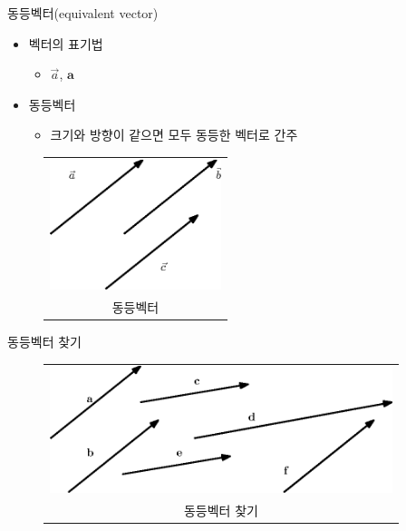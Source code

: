 \documentclass{beamer}
\begin{document}
\begin{frame}{동등벡터(equivalent vector)}

\begin{itemize}
\item 벡터의 표기법
\begin{itemize}
\item $\vec{a}$, $\mathbf a$
\end{itemize}
\end{itemize}

\begin{itemize}
\item 동등벡터
\begin{itemize}
\item 크기와 방향이 같으면 모두 동등한 벡터로 간주
\end{itemize}
\end{itemize}

\begin{figure}
\begin{tabular}{c}
\includegraphics[width=5cm]{Math_vector/equivalentVectors.eps}\\
{\tiny 동등벡터}
\end{tabular}
\end{figure}

\end{frame}

\begin{frame}{동등벡터 찾기}

\begin{figure}
\begin{tabular}{c}
\includegraphics[width=10cm]{./Math_vector/equivalentVectors2.eps}\\
{\tiny 동등벡터 찾기}
\end{tabular}
\end{figure}

\end{frame}
\end{document}
